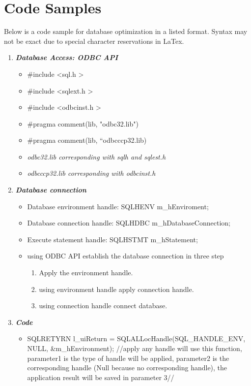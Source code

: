\documentclass[compsoc, draftclsnofoot, onecolumn, letterpaper, 10pt]{IEEEtran}
\begin{document}
\section{Code Samples}
Below is a code sample for database optimization in a listed format. Syntax may not be exact due to special character reservations in LaTex. 
\begin{enumerate}
   \item \textbf{\textit {Database Access: ODBC API}}
   \begin{itemize}
          \item #include \textless sql.h \textgreater 
          \item #include \textless sqlext.h \textgreater
          \item #include \textless odbcinst.h \textgreater 
          \item #pragma comment(lib, "odbc32.lib") 
          \item #pragma comment(lib, “odbcccp32.lib)
          \item \textit {odbc32.lib corresponding with sqlh and sqlest.h}
          \item \textit {odbcccp32.lib corresponding with odbcinst.h}
       \end{itemize}
   \item \textbf{\textit {Database connection}}
   \begin{itemize}
        \item Database environment handle: SQLHENV m\_hEnviroment; 
        \item Database connection handle: SQLHDBC m\_hDatabaseConnection; 
        \item Execute statement handle: SQLHSTMT m\_hStatement;
        \item using ODBC API  establish the database connection in three step
           \begin{enumerate}
              \item Apply the environment handle.
              \item using environment handle apply connection handle.
              \item using connection handle connect database.
         \end{enumerate}
    \end{itemize}
   \item \textbf{\textit{Code}}
     \begin{itemize}
        \item SQLRETYRN l\_uiReturn = SQLALLocHandle(SQL\_HANDLE\_ENV, NULL, &m\_hEnvironment); \newline
        //apply any handle will use this function, parameter1 is the type of handle will be applied, parameter2 is the corresponding handle (Null because no corresponding handle), the application result will be saved in parameter 3//
     \end{itemize}
     

\end{enumerate}
\end{document}
